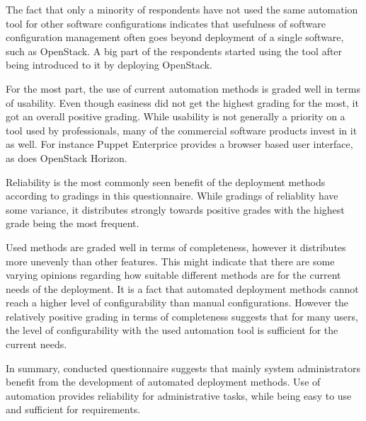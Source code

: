 \documentclass[officiallayout]{tktla}
\begin{document}
The fact that only a minority of respondents have not used the same automation
tool for other software configurations indicates that usefulness of software
configuration management often goes beyond deployment of a single software,
such as OpenStack. A big part of the respondents started using the tool after
being introduced to it by deploying OpenStack.

For the most part, the use of current automation methods is graded well in
terms of usability. Even though easiness did not get the highest grading for
the most, it got an overall positive grading. While usability is not generally
a priority on a tool used by professionals, many of the commercial software
products invest in it as well. For instance Puppet Enterprice provides a
browser based user interface, as does OpenStack Horizon.

Reliability is the most commonly seen benefit of the deployment methods
according to gradings in this questionnaire. While gradings of reliablity have
some variance, it distributes strongly towards positive grades with the highest
grade being the most frequent.

Used methods are graded well in terms of completeness, however it distributes
more unevenly than other features. This might indicate that there are some
varying opinions regarding how suitable different methods are for the current
needs of the deployment. It is a fact that automated deployment methods cannot
reach a higher level of configurability than manual configurations. However
the relatively positive grading in terms of completeness suggests that for many
users, the level of configurability with the used automation tool is sufficient
for the current needs.

In summary, conducted questionnaire suggests that mainly system administrators
benefit from the development of automated deployment methods. Use of automation
provides reliability for administrative tasks, while being easy to use and
sufficient for requirements.
\end{document}
